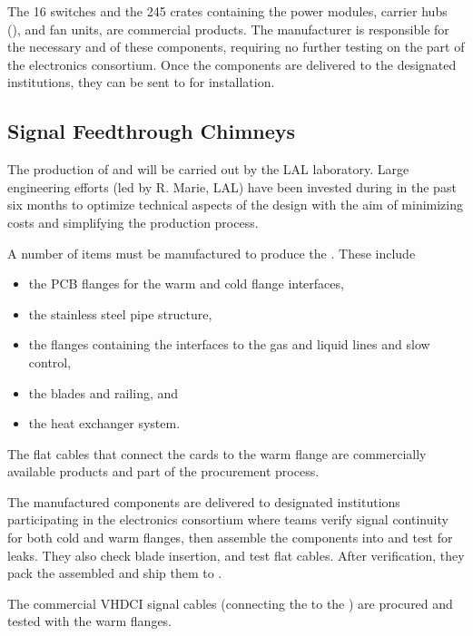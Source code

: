 The  \num{16}  switches and the \num{245}  crates containing the power modules, carrier hubs (), and fan units, are commercial products. The manufacturer is responsible for the necessary  and   of these components, requiring no further testing on the part of the \dual electronics consortium. Once the components are delivered to the designated institutions, they can be sent to  for installation. 


\subsection{Signal Feedthrough Chimneys}
\label{ssec:dp-tpcelec-prod-sft}

The production of  and  will be carried out by the LAL laboratory. Large engineering efforts (led by R. Marie, LAL) have been invested during in the past six months to optimize technical aspects of the design with the aim of minimizing costs and simplifying the production process.

A number of items must be manufactured to produce the . These include 
\begin{itemize}
\item the PCB flanges for the warm and cold \fdth flange interfaces, 
\item the stainless steel pipe structure, 
\item the flanges containing the interfaces to the gas and liquid lines and slow control, 
\item the blades and railing, and 
\item the heat exchanger system. 
\end{itemize}
The flat cables that connect the  cards to the warm flange are commercially available products and part of the  procurement process. 

The manufactured components are delivered to designated institutions participating in the \dual electronics consortium where teams verify signal continuity for both cold and warm flanges, then assemble the components into  and test for leaks. They also check blade insertion, and test flat cables. After verification, they pack the assembled  and ship them to . 

The commercial VHDCI signal cables (connecting the  to the ) are procured and tested with the  warm flanges.


